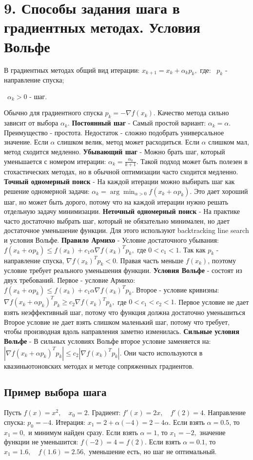 \documentclass[12pt,a4paper]{article}
\begin{document}
\section{9. Способы задания шага в градиентных методах. Условия Вольфе}
В градиентных методах общий вид итерации: $x_{k+1}=x_k+\alpha_k p_k,$
где:
\noindent\textbullet\ $p_k$ - направление спуска;\par
\noindent\textbullet\ $\alpha_k>0$ - шаг.\par
Обычно для градиентного спуска $p_k=-\nabla f(x_k).$
Качество метода сильно зависит от выбора $\alpha_k$.
\textbf{Постоянный шаг} - Самый простой вариант: $\alpha_k=\alpha.$
Преимущество - простота. Недостаток - сложно подобрать универсальное значение.
Если $\alpha$ слишком велик, метод может расходиться. Если $\alpha$ слишком мал, метод сходится медленно.
\textbf{Убывающий шаг} - Можно брать шаг, который уменьшается с номером итерации: $\alpha_k=\frac{\alpha_0}{k+1}.$
Такой подход может быть полезен в стохастических методах, но в обычной оптимизации часто сходится медленно.
\textbf{Точный одномерный поиск} - На каждой итерации можно выбирать шаг как решение одномерной задачи: $\alpha_k=\arg\min_{\alpha>0} f(x_k+\alpha p_k).$
Это дает хороший шаг, но может быть дорого, потому что на каждой итерации нужно решать отдельную задачу минимизации.
\textbf{Неточный одномерный поиск} - На практике часто достаточно выбрать шаг, который не обязательно минимален, но дает достаточное уменьшение функции. Для этого используют backtracking line search и условия Вольфе.
\textbf{Правило Армихо} - Условие достаточного убывания: $f(x_k+\alpha p_k)\le f(x_k)+c_1\alpha \nabla f(x_k)^T p_k,$
где $0<c_1<1.$
Так как $p_k$ - направление спуска, $\nabla f(x_k)^T p_k<0.$
Правая часть меньше $f(x_k)$, поэтому условие требует реального уменьшения функции.
\textbf{Условия Вольфе} - состоят из двух требований.
Первое - условие Армихо: $f(x_k+\alpha p_k)\le f(x_k)+c_1\alpha \nabla f(x_k)^T p_k.$
Второе - условие кривизны: $\nabla f(x_k+\alpha p_k)^T p_k \ge c_2\nabla f(x_k)^T p_k,$
где $0<c_1<c_2<1.$
Первое условие не дает
взять неэффективный шаг, потому что функция должна достаточно
уменьшиться
Второе условие не дает взять слишком маленький шаг, потому что требует, чтобы производная вдоль направления заметно изменилась.
\textbf{Сильные условия Вольфе} - В сильных условиях Вольфе второе условие заменяется на: $|\nabla f(x_k+\alpha p_k)^T p_k| \le c_2|\nabla f(x_k)^T p_k|.$
Они часто используются в квазиньютоновских методах и методе сопряженных градиентов.
\subsection{Пример выбора шага}
Пусть $f(x)=x^2,\quad x_0=2.$
Градиент: $f'(x)=2x,\quad f'(2)=4.$
Направление спуска: $p_0=-4.$
Итерация: $x_1=2+\alpha(-4)=2-4\alpha.$
Если взять $\alpha=0.5$, то $x_1=0,$
и минимум найден сразу.
Если взять $\alpha=1$, то $x_1=-2,$
значение функции не уменьшится: $f(-2)=4=f(2).$
Если взять $\alpha=0.1$, то $x_1=1.6,\quad f(1.6)=2.56,$
уменьшение есть, но шаг не оптимальный.
\end{document}
